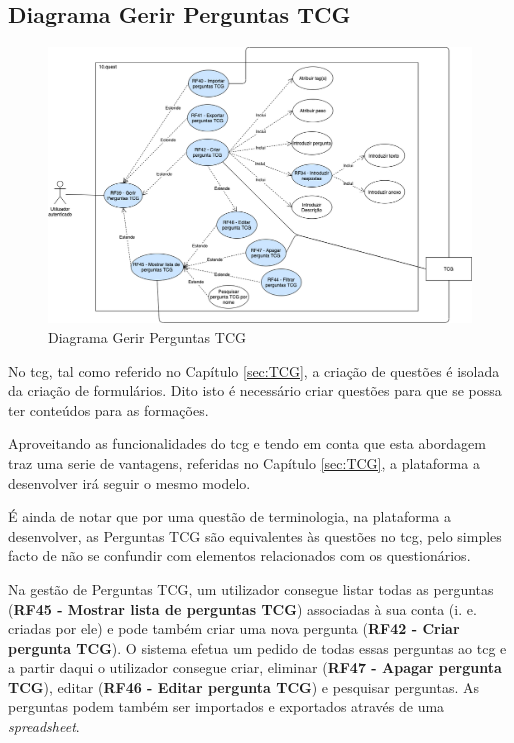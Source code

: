 \subsection{Diagrama Gerir Perguntas TCG}
\label{d:perguntastcg}
\begin{figure}[ht!]
	\begin{center}
		\includegraphics[width=1\textwidth]{img/rf/gerir-perguntas-tcg}
		\caption{Diagrama Gerir Perguntas TCG}
		\label{fig:rf-gerir-perguntas-tcg}
	\end{center}
\end{figure}

No \acrshort{tcg}, tal como referido no Capítulo \ref{sec:TCG}, a criação de questões é isolada da criação de formulários. Dito isto é necessário criar questões para que se possa ter conteúdos para as formações. 

Aproveitando as funcionalidades do \acrshort{tcg} e  tendo em conta que esta abordagem traz uma serie de vantagens, referidas no Capítulo \ref{sec:TCG}, a plataforma a desenvolver irá seguir o mesmo modelo. 

É ainda de notar que por uma questão de terminologia, na plataforma a desenvolver, as Perguntas TCG são equivalentes às questões no \acrshort{tcg}, pelo simples facto de não se confundir com elementos relacionados com os questionários.

Na gestão de Perguntas TCG, um utilizador consegue listar todas as perguntas (\textbf{RF45 - Mostrar lista de perguntas TCG}) associadas à sua conta (i. e. criadas por ele) e pode também criar uma nova pergunta (\textbf{RF42 - Criar pergunta TCG}). O sistema efetua um pedido de todas essas perguntas ao \acrshort{tcg} e a partir daqui o utilizador consegue criar, eliminar (\textbf{RF47 - Apagar pergunta TCG}), editar (\textbf{RF46 - Editar pergunta TCG}) e pesquisar perguntas. As perguntas podem também ser importados e exportados através de uma \textit{spreadsheet}.

